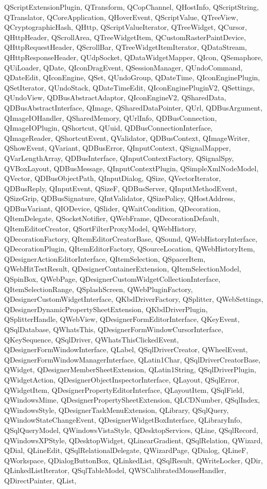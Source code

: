 {{	QScriptExtensionPlugin, QTransform, QCopChannel, QHostInfo, QScriptString, QTranslator, QCoreApplication, QHoverEvent, QScriptValue, QTreeView, QCryptographicHash, QHttp, QScriptValueIterator, QTreeWidget, QCursor, QHttpHeader, QScrollArea, QTreeWidgetItem, QCustomRasterPaintDevice, QHttpRequestHeader, QScrollBar, QTreeWidgetItemIterator, QDataStream, QHttpResponseHeader, QUdpSocket, QDataWidgetMapper, QIcon, QSemaphore, QUiLoader, QDate, QIconDragEvent, QSessionManager, QUndoCommand, QDateEdit, QIconEngine, QSet, QUndoGroup, QDateTime, QIconEnginePlugin, QSetIterator, QUndoStack, QDateTimeEdit, QIconEnginePluginV2, QSettings,
	QUndoView, QDBusAbstractAdaptor, QIconEngineV2, QSharedData, QDBusAbstractInterface, QImage, QSharedDataPointer, QUrl, QDBusArgument, QImageIOHandler, QSharedMemory, QUrlInfo, QDBusConnection, QImageIOPlugin, QShortcut, QUuid, QDBusConnectionInterface, QImageReader, QShortcutEvent,
	QValidator, QDBusContext, QImageWriter, QShowEvent, QVariant, QDBusError, QInputContext, QSignalMapper, QVarLengthArray, QDBusInterface, QInputContextFactory, QSignalSpy, QVBoxLayout, QDBusMessage, QInputContextPlugin, QSimpleXmlNodeModel, QVector, QDBusObjectPath, QInputDialog, QSize, QVectorIterator, QDBusReply, QInputEvent, QSizeF, QDBusServer, QInputMethodEvent, QSizeGrip, QDBusSignature, QIntValidator, QSizePolicy, QHostAddress, QDBusVariant, QIODevice, QSlider,  QWaitCondition, QDecoration, QItemDelegate, QSocketNotifier, QWebFrame, QDecorationDefault, QItemEditorCreator, QSortFilterProxyModel, QWebHistory, QDecorationFactory, QItemEditorCreatorBase, QSound, QWebHistoryInterface, QDecorationPlugin, QItemEditorFactory, QSourceLocation, QWebHistoryItem, QDesignerActionEditorInterface, QItemSelection, QSpacerItem, QWebHitTestResult, QDesignerContainerExtension, QItemSelectionModel, QSpinBox, QWebPage, QDesignerCustomWidgetCollectionInterface, QItemSelectionRange, QSplashScreen, QWebPluginFactory, QDesignerCustomWidgetInterface, QKbdDriverFactory, QSplitter, QWebSettings, QDesignerDynamicPropertySheetExtension, QKbdDriverPlugin, QSplitterHandle, QWebView, QDesignerFormEditorInterface, QKeyEvent, QSqlDatabase, QWhatsThis, QDesignerFormWindowCursorInterface, QKeySequence, QSqlDriver, QWhatsThisClickedEvent, QDesignerFormWindowInterface, QLabel, QSqlDriverCreator, QWheelEvent, QDesignerFormWindowManagerInterface, QLatin1Char, QSqlDriverCreatorBase, QWidget, QDesignerMemberSheetExtension, QLatin1String, QSqlDriverPlugin, QWidgetAction, QDesignerObjectInspectorInterface, QLayout, QSqlError, QWidgetItem, QDesignerPropertyEditorInterface, QLayoutItem, QSqlField, QWindowsMime, QDesignerPropertySheetExtension, QLCDNumber, QSqlIndex, QWindowsStyle, QDesignerTaskMenuExtension, QLibrary, QSqlQuery, QWindowStateChangeEvent, QDesignerWidgetBoxInterface, QLibraryInfo, QSqlQueryModel, QWindowsVistaStyle, QDesktopServices, QLine, QSqlRecord, QWindowsXPStyle, QDesktopWidget, QLinearGradient, QSqlRelation, QWizard, QDial, QLineEdit, QSqlRelationalDelegate, QWizardPage, QDialog, QLineF, QWorkspace, QDialogButtonBox, QLinkedList, QSqlResult, QWriteLocker, QDir, QLinkedListIterator, QSqlTableModel, QWSCalibratedMouseHandler, QDirectPainter, QList,
}}
